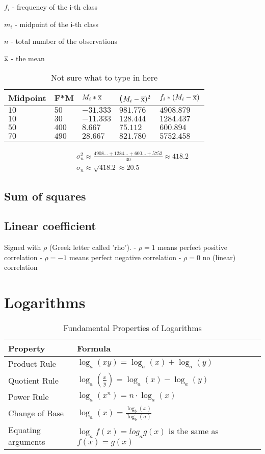 \documentclass{article}
\begin{document}
$f_i$ - frequency of the i-th class

$m_i$ - midpoint of the i-th class

$n$ - total number of the observations

$\overline{\rm x}$ - the mean

\begin{table}[htbp]
\centering
\begin{tabular}{|l|l|l|l|l|}
\hline
\textbf{Midpoint} & \textbf{F*M} & \textbf{$M_i * \overline{\rm x}$} & \textbf{($M_i - \overline{\rm x})^2$} & \textbf{$f_i * (M_i - \overline{\rm x})$} \\
\hline
$10$ & $50$ & $-31.333$ & $981.776$ & $4908.879$ \\
\hline
$10$ & $30$ & $-11.333$ & $128.444$ & $1284.437$ \\
\hline
$50$ & $400$ & $8.667$ & $75.112$ & $600.894$ \\
\hline
$70$ & $490$ & $28.667$ & $821.780$ & $5752.458$  \\
\hline
\end{tabular}
\caption{Not sure what to type in here}
\label{tab:estimating_a_mean_and_variance_3}
\end{table}
\begin{equation}
  \begin{gathered}
    \sigma^2_n \approx \frac{4908... + 1284... + 600... + 5752}{30} \approx 418.2  \\
    \sigma_n \approx \sqrt{418.2} \approx 20.5
  \end{gathered}
\end{equation}
\subsection{Sum of squares}
\subsection{Linear coefficient}
Signed with $\rho$ (Greek letter called 'rho').
- $\rho = 1$ means perfect positive correlation
- $\rho = -1$ means perfect negative correlation
- $\rho = 0$ no (linear) correlation
\section{Logarithms}
\begin{table}[htbp]
\centering
\begin{tabular}{|l|l|}
\hline
\textbf{Property} & \textbf{Formula} \\
\hline
Product Rule & $\log_a(xy) = \log_a(x) + \log_a(y)$ \\
\hline
Quotient Rule & $\log_a\left(\frac{x}{y}\right) = \log_a(x) - \log_a(y)$ \\
\hline
Power Rule & $\log_a(x^n) = n \cdot \log_a(x)$ \\
\hline
Change of Base & $\log_a(x) = \frac{\log_b(x)}{\log_b(a)}$ \\
\hline
Equating arguments & $\log_af(x) = log_ag(x)$ is the same as $f(x) = g(x)$ \\
\hline
\end{tabular}
\caption{Fundamental Properties of Logarithms}
\label{tab:log_properties}
\end{table}
\end{document}
